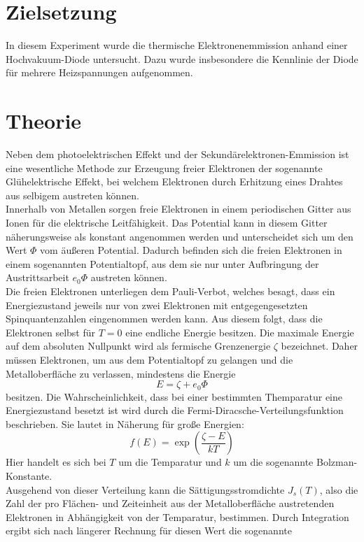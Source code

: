 \section{Zielsetzung}
In diesem Experiment wurde die thermische Elektronenemmission anhand einer Hochvakuum-Diode untersucht. Dazu wurde insbesondere die 
Kennlinie der Diode für mehrere Heizspannungen aufgenommen.
\section{Theorie}
Neben dem photoelektrischen Effekt und der Sekundärelektronen-Emmission ist eine wesentliche Methode zur Erzeugung freier Elektronen der
sogenannte Glühelektrische Effekt, bei welchem Elektronen durch Erhitzung eines Drahtes aus selbigem austreten können. \\
Innerhalb von Metallen sorgen freie Elektronen in einem periodischen Gitter aus Ionen für die elektrische Leitfähigkeit. Das Potential 
kann in diesem Gitter näherungsweise als konstant angenommen werden und unterscheidet sich um den Wert $\Phi$ vom äußeren Potential.
Dadurch befinden sich die freien Elektronen in einem sogenannten Potentialtopf, aus dem sie nur unter Aufbringung der Austrittsarbeit
$e_0\Phi$ austreten können. \\
Die freien Elektronen unterliegen dem Pauli-Verbot, welches besagt, dass ein Energiezustand jeweils nur von zwei Elektronen mit entgegengesetzten 
Spinquantenzahlen eingenommen werden kann. Aus diesem folgt, dass die Elektronen selbst für $T=0$ eine endliche Energie besitzen. 
Die maximale Energie auf dem absoluten Nullpunkt wird als fermische Grenzenergie $\zeta$ bezeichnet. Daher müssen Elektronen, um aus dem Potentialtopf
zu gelangen und die Metalloberfläche zu verlassen, mindestens die Energie
\begin{equation}
E=\zeta+e_0\Phi
\end{equation}
besitzen. Die Wahrscheinlichkeit, dass bei einer bestimmten Themparatur eine Energiezustand besetzt ist wird durch die 
Fermi-Diracsche-Verteilungsfunktion beschrieben. Sie lautet in Näherung für große Energien:
\begin{equation}
f(E)=\exp(\frac{\zeta-E}{kT})
\end{equation}
Hier handelt es sich bei $T$ um die Temparatur und $k$ um die sogenannte Bolzman-Konstante. \\
Ausgehend von dieser Verteilung kann die Sättigungsstromdichte $J_s(T)$, also die Zahl der pro Flächen- und Zeiteinheit aus der Metalloberfläche
austretenden Elektronen in Abhängigkeit von der Temparatur, bestimmen. Durch Integration ergibt sich nach längerer Rechnung für diesen Wert die sogenannte
